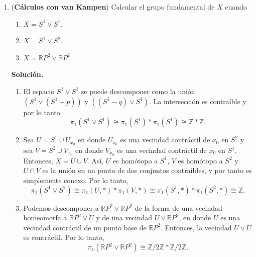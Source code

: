 \documentclass[11pt,a4paper]{article}
\theoremstyle{plain}
\theoremstyle{definition}
\theoremstyle{remark}
\newcommand{\RR}{\mathbb R}
\newcommand{\ZZ}{\mathbb Z}
\begin{document}
\begin{enumerate}[label=\arabic*.,leftmargin=*]
\noindent\textbf{Solución.}
\begin{enumerate}[label=\alph*)]
\item Si $n=0$, entonces $\RR^n$ no es homeomorfo a $\RR^1$. Si $n>1$ y
$f:\RR^n\to\RR^1$ es un homeomorfismo, obtenemos un homeomorfismo entre
$\RR^n-\{0\}$ y $\RR^1-\{f(0)\}$, lo cual es imposible porque
$\RR^1-\{f(0)\}$ no es conexo y $\RR^n-\{0\}$ es conexo.
\item Si $m=0$, $\RR^m$ no es homeomorfo a $\RR^2$. Si $m>2$ y
$f:\RR^m\to\RR^2$ es un homeomorfismo, obtenemos un homeomorfismo entre
$\RR^m-\{0\}$ y $\RR^2-\{f(0)\}$, que es imposible debido a que
$\RR^2-\{f(0)\}$ tiene el mismo tipo de homotopía de $S^1$ (y por tanto
$\pi_1(\RR^2-\{f(0)\},*)\cong\ZZ$) y $\RR^m-\{0\}$ tiene el mismo tipo de
homotopía de $S^{m-1}$ (por tanto, $\RR^m-\{0\}$ es simplemente conexo).
Contradicción.
\end{enumerate}

\item (\textbf{Cálculos con van Kampen}) Calcular el grupo fundamental de
$X$ cuando
\begin{enumerate}[label=\alph*)]
\item $X=S^1\vee S^1$.
\item $X=S^1\vee S^2$.
\item $X=\RR P^2\vee\RR P^2$.
\end{enumerate}

\noindent\textbf{Solución.}
\begin{enumerate}[label=\alph*)]
\item El espacio $S^1\vee S^1$ se puede descomponer como la unión
$(S^1\vee(S^1-p))$ y $((S^1-q)\vee S^1)$. La intersección es contraíble y
por lo tanto
\[
\pi_1(S^1\vee S^1)\cong\pi_1(S^1)*\pi_1(S^1)\cong\ZZ*\ZZ.
\]
\item Sea $U=S^1\cup U_{x_0}$ en donde $U_{x_0}$ es una vecindad contráctil
de $x_0$ en $S^2$ y sea $V=S^2\cup V_{x_0}$ en donde $V_{x_0}$ es una
vecindad contráctil de $x_0$ en $S^1$. Entonces, $X=U\cup V$. Así, $U$ es
homótopo a $S^1$, $V$ es homótopo a $S^2$ y $U\cap V$ es la unión en un
punto de dos conjuntos contraíbles, y por tanto es simplemente conexo. Por
lo tanto,
\[
\pi_1(S^1\vee S^2)\cong\pi_1(U,*)*\pi_1(V,*)\cong\pi_1(S^1,*)*\pi_1(S^2,*)\cong\ZZ.
\]
\item Podemos descomponer a $\RR P^2\vee\RR P^2$ de la forma de una vecindad
homeomorfa a $\RR P^2\vee U$ y de una vecindad $U\vee\RR P^2$, en donde $U$
es una vecindad contráctil de un punto base de $\RR P^2$. Entonces, la
vecindad $U\vee U$ es contráctil. Por lo tanto,
\[
\pi_1(\RR P^2\vee\RR P^2)\cong\ZZ/2\ZZ*\ZZ/2\ZZ.
\]
\end{enumerate}


\end{enumerate}
\end{document}
